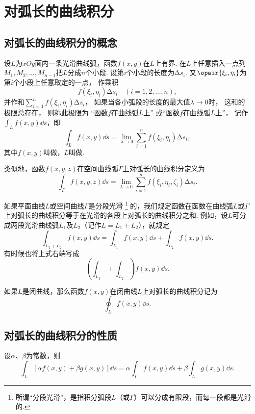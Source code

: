 \section{对弧长的曲线积分}
\subsection{对弧长的曲线积分的概念}
\begin{definition}
设\(L\)为\(xOy\)面内一条光滑曲线弧，函数\(f(x,y)\)在\(L\)上有界.
在\(L\)上任意插入一点列\(M_1,M_2,\dotsc,M_{n-1}\)把\(L\)分成\(n\)个小段.
设第\(i\)个小段的长度为\(\increment s_i\).
又\(\opair{\xi_i,\eta_i}\)为第\(i\)个小段上任意取定的一点，
作乘积\[
	f(\xi_i,\eta_i) \increment s_i \quad(i=1,2,\dotsc,n),
\]
并作和\(\sum_{i=1}^n f(\xi_i,\eta_i) \increment s_i\)，
如果当各小弧段的长度的最大值\(\lambda\to0\)时，
这和的极限总存在，
则称此极限为
“函数\(f\)在曲线弧\(L\)上”
或“函数\(f\)在曲线弧\(L\)上”，
记作\(\int_L f(x,y) \dd{s}\)，即\[
\int_L f(x,y) \dd{s}
= \lim_{\lambda\to0} \sum_{i=1}^n f(\xi_i,\eta_i) \increment s_i,
\]其中\(f(x,y)\)叫做，\(L\)叫做.

类似地，函数\(f(x,y,z)\)在空间曲线弧\(\Gamma\)上对弧长的曲线积分定义为\[
\int_\Gamma f(x,y,z) \dd{s}
=\lim_{\lambda\to0} \sum_{i=1}^n f(\xi_i,\eta_i,\zeta_i) \increment s_i.
\]

如果平面曲线\(L\)或空间曲线\(\Gamma\)是分段光滑%
\footnote{所谓“分段光滑”，是指积分弧段\(L\)（或\(\Gamma\)）可以分成有限段，而每一段都是光滑的.}%
的，我们规定函数在函数在曲线弧\(L\)或\(\Gamma\)上对弧长的曲线积分等于在光滑的各段上对弧长的曲线积分之和.
例如，设\(L\)可分成两段光滑曲线弧\(L_1\)及\(L_2\)（记作\(L=L_1+L_2\)），就规定
\[
	\int_{L_1+L_2} f(x,y) \dd{s}
	= \int_{L_1} f(x,y) \dd{s}
	+ \int_{L_2} f(x,y) \dd{s}.
\]
有时候也将上式右端写成\[
	\left( \int_{L_1} + \int_{L_2} \right) f(x,y) \dd{s}.
\]

如果\(L\)是闭曲线，那么函数\(f(x,y)\)在闭曲线\(L\)上对弧长的曲线积分记为\[
	\oint_L f(x,y) \dd{s}.
\]
\end{definition}

\subsection{对弧长的曲线积分的性质}
\begin{property}\label{theorem:线积分与面积分.第一类曲线积分性质1}
设\(\alpha\)、\(\beta\)为常数，则\[
	\int_L [\alpha f(x,y) + \beta g(x,y)] \dd{s}
	= \alpha \int_L f(x,y) \dd{s}
	+ \beta \int_L g(x,y) \dd{s}.
\]
\end{property}

